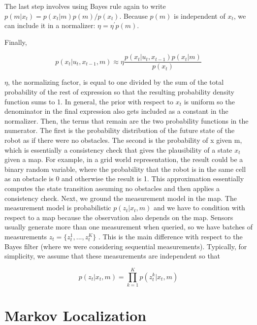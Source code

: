 \documentclass[twoside]{article}
\begin{document}
The last step involves using Bayes rule again to write $p(m|x_t) = p(x_t|m)p(m)/p(x_t)$. Because $p(m)$ is independent of $x_t$, we can include it in a normalizer: $\eta = \eta^{\prime} p(m)$.

Finally,

\begin{equation}
    p \left( x _ { t } | u _ { t } , x _ { t - 1 } , m \right) \approx \eta \frac { p \left( x _ { t } | u _ { t } , x _ { t - 1 } \right) p \left( x _ { t } | m \right) } { p \left( x _ { t } \right) }
    \label{pnormalized}
\end{equation}

$\eta$, the normalizing factor, is equal to one divided by the sum of the total probability of the rest of expression so that the resulting probability density function sums to 1. In general, the prior with respect to $x_t$ is uniform so the denominator in the final expression also gets included as a constant in the normalizer. Then, the terms that remain are the two probability functions in the numerator. The first is the probability distribution of the future state of the robot as if there were no obstacles. The second is the probability of x given m, which is essentially a consistency check that gives the plausibility of a state $x_t$ given a map. For example, in a grid world representation, the result could be a binary random variable, where the probability that the robot is in the same cell as an obstacle is 0 and otherwise the result is 1. This approximation essentially computes the state transition assuming no obstacles and then applies a consistency check. Next, we ground the measurement model in the map. The measurement model is probabilistic $p(z_t|x_t, m)$ and we have to condition with respect to a map because the observation also depends on the map. Sensors usually generate more than one measurement when queried, so we have batches of measurements $z_t = \{z_t^1, ..., z_t^K\}$ . This is the main difference with respect to the Bayes filter (where we were considering sequential measurements). Typically, for simplicity, we assume that these measurements are independent so that

\begin{equation}
    p \left( z _ { t } | x _ { t } , m \right) = \prod _ { k = 1 } ^ { K } p \left( z _ { t } ^ { k } | x _ { t } , m \right)
\end{equation}

\section{Markov Localization}
\end{document}
